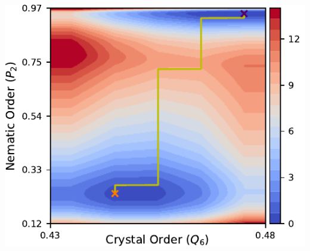 \documentclass[aspectratio=169]{beamer}
\begin{document}
\begin{frame}
\begin{columns}[T, onlytextwidth]
    \vspace{2.5ex}

    \includegraphics[width=\textwidth]{../figures//fig-pathway_10p25/subfig-pathway_10p25_MFEP.pdf}

  \end{columns}
  
\end{frame}

\end{document}

